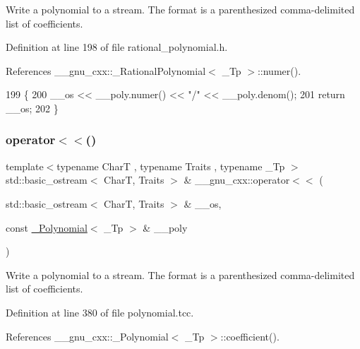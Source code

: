 Write a polynomial to a stream. The format is a parenthesized comma-\/delimited list of coefficients. 

Definition at line 198 of file rational\+\_\+polynomial.\+h.



References \+\_\+\+\_\+gnu\+\_\+cxx\+::\+\_\+\+Rational\+Polynomial$<$ \+\_\+\+Tp $>$\+::numer().


\begin{DoxyCode}
199     \{
200       \_\_os << \_\_poly.numer() << \textcolor{stringliteral}{"/"} << \_\_poly.denom();
201       \textcolor{keywordflow}{return} \_\_os;
202     \}
\end{DoxyCode}
\mbox{\label{namespace____gnu__cxx_ad713743dbfc30fba653621d1f7e99d3c}} 
\subsubsection{\texorpdfstring{operator$<$$<$()}{operator<<()}\hspace{0.1cm}{\footnotesize\ttfamily [2/2]}}
{\footnotesize\ttfamily template$<$typename CharT , typename Traits , typename \+\_\+\+Tp $>$ \\
std\+::basic\+\_\+ostream$<$ CharT, Traits $>$ \& \+\_\+\+\_\+gnu\+\_\+cxx\+::operator$<$$<$ (\begin{DoxyParamCaption}\item[{std\+::basic\+\_\+ostream$<$ CharT, Traits $>$ \&}]{\+\_\+\+\_\+os,  }\item[{const \hyperlink{class____gnu__cxx_1_1__Polynomial}{\+\_\+\+Polynomial}$<$ \+\_\+\+Tp $>$ \&}]{\+\_\+\+\_\+poly }\end{DoxyParamCaption})}

Write a polynomial to a stream. The format is a parenthesized comma-\/delimited list of coefficients. 

Definition at line 380 of file polynomial.\+tcc.



References \+\_\+\+\_\+gnu\+\_\+cxx\+::\+\_\+\+Polynomial$<$ \+\_\+\+Tp $>$\+::coefficient().


